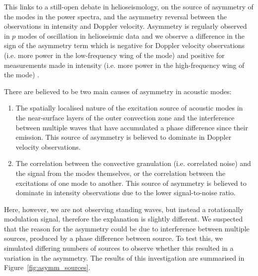 This links to a still-open debate in helioseismology, on the source of asymmetry of the modes in the power spectra, and the asymmetry reversal between the observations in intensity and Doppler velocity. Asymmetry is regularly observed in $p$ modes of oscillation in helioseismic data and we observe a difference in the sign of the asymmetry term which is negative for Doppler velocity observations (i.e. more power in the low-frequency wing of the mode) and positive for measurements made in intensity (i.e. more power in the high-frequency wing of the mode) \citep{duvall_asymmetries_1993, chaplin_depth_1999, howe_validation_2015, basu_asteroseismic_2017}.

There are believed to be two main causes of asymmetry in acoustic modes:

\begin{enumerate}
	\item{The spatially localised nature of the excitation source of acoustic modes in the near-surface layers of the outer convection zone and the interference between multiple waves that have accumulated a phase difference since their emission. This source of asymmetry is believed to dominate in Doppler velocity observations.}
	
	\item{The correlation between the convective granulation (i.e. correlated noise) and the signal from the modes themselves, or the correlation between the excitations of one mode to another. This source of asymmetry is believed to dominate in intensity observations due to the lower signal-to-noise ratio.}
\end{enumerate}

Here, however, we are not observing standing waves, but instead a rotationally modulation signal, therefore the explanation is slightly different. We suspected that the reason for the asymmetry could be due to interference between multiple sources, produced by a phase difference between source. To test this, we simulated differing numbers of sources to observe whether this resulted in a variation in the asymmetry. The results of this investigation are summarised in Figure~\ref{fig:asymm_sources}.

